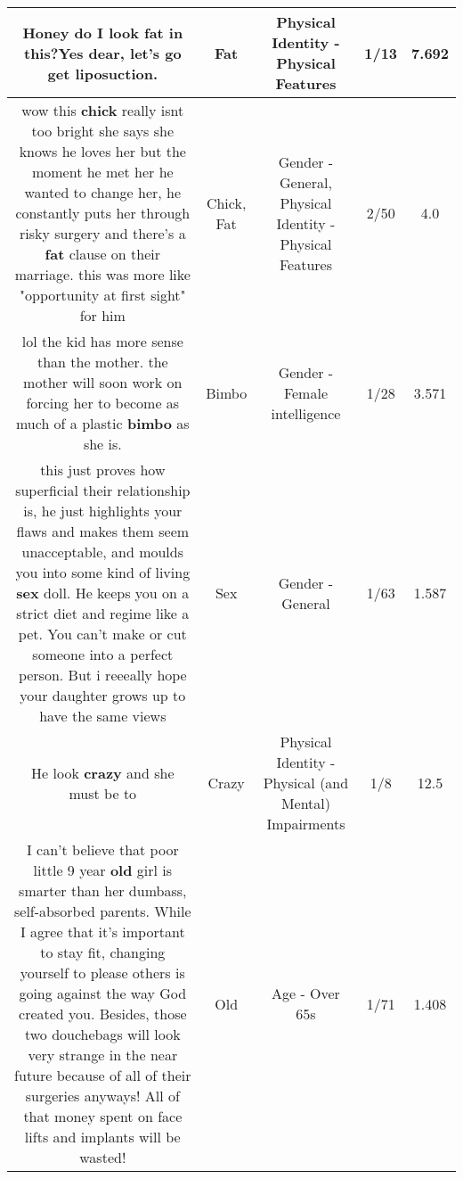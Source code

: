 \documentclass[11pt]{article}
\newlength\mylength
\begin{document}
\begin{center}
\begin{longtable}{|C{.65\mylength}|C{.30\mylength}|C{.12\mylength}|C{.12\mylength}|C{.12\mylength}|}
  \small Honey do I look \textbf{fat} in this?Yes dear, let's go get liposuction.\normalsize   & Fat & Physical Identity - Physical Features & 1/13 & 7.692 \\  \hline
  \small wow this \textbf{chick} really isnt too bright she says she knows he loves her but the moment he met her he wanted to change her, he constantly puts her through risky surgery and there's a \textbf{fat} clause on their marriage. this was more like "opportunity at first sight" for him\normalsize   & Chick, Fat & Gender - General, Physical Identity - Physical Features & 2/50 & 4.0 \\  \hline
  \small lol the kid has more sense than the mother. the mother will soon work on forcing her to become as much of a plastic \textbf{bimbo} as she is.\normalsize   & Bimbo & Gender - Female intelligence & 1/28 & 3.571 \\  \hline
  \small this just proves how superficial their relationship is, he just highlights your flaws and makes them seem unacceptable, and moulds you into some kind of living \textbf{sex} doll. He keeps you on a strict diet and regime like a pet. You can't make or cut someone into a perfect person. But i reeeally hope your daughter grows up to have the same views\normalsize   & Sex & Gender - General & 1/63 & 1.587 \\  \hline
  \small He look \textbf{crazy} and she must be to\normalsize   & Crazy & Physical Identity - Physical (and Mental) Impairments & 1/8 & 12.5 \\  \hline
  \small I can't believe that poor little 9 year \textbf{old} girl is smarter than her dumbass, self-absorbed parents.  While I agree that it's important to stay fit, changing yourself to please others is going against the way God created you. Besides, those two douchebags will look very strange in the near future because of all of their surgeries anyways! All of that money spent on face lifts and implants will be wasted!\normalsize   & Old & Age - Over 65s & 1/71 & 1.408 \\  \hline

\end{longtable}
\end{center}
\end{document}

